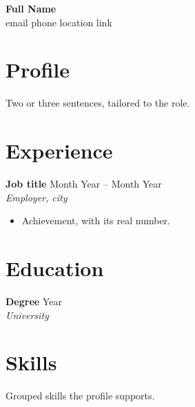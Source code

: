 \documentclass[10pt,a4paper]{article}
\newcommand{\entry}[3]{\textbf{#1} \hfill #3\\ \emph{#2}\vspace{-2pt}}
\begin{document}
{\LARGE\textbf{Full Name}}\\
email \quad phone \quad location \quad link

\section*{Profile}
Two or three sentences, tailored to the role.

\section*{Experience}
\entry{Job title}{Employer, city}{Month Year -- Month Year}
\begin{itemize}\setlength\itemsep{0pt}
  \item Achievement, with its real number.
\end{itemize}

\section*{Education}
\entry{Degree}{University}{Year}

\section*{Skills}
Grouped skills the profile supports.
\end{document}
